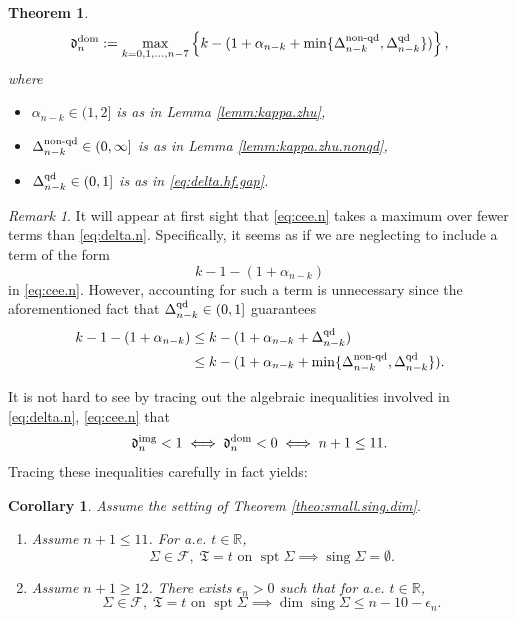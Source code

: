 \documentclass[11pt, letterpaper, reqno]{amsart}
\numberwithin{equation}{section}
\newtheorem{Thm}[Def]{Theorem}
\newtheorem{Cor}[Def]{Corollary}
\theoremstyle{remark}
\newtheorem{Rem}[Def]{Remark}
\newcommand{\RR}{\mathbb{R}}
\newcommand{\frT}{\mathfrak{T}}
\newcommand{\supp}{\operatorname{spt}}
\newcommand{\sing}{\operatorname{sing}}
\begin{document}
\begin{Thm}
\begin{equation}
	\end{equation}
	\begin{equation} \label{eq:cee.n}
		\mathfrak{d}_{n}^{\textnormal{dom}} := \max_{k = 0, 1, \ldots, n-7} \left\{ k - (1 + \alpha_{n-k} + \min \{ \Delta^{\textnormal{non-qd}}_{n-k},  \Delta^{\textnormal{qd}}_{n-k} \} ) \right \},
	\end{equation}
	where
	\begin{itemize}
		\item $\alpha_{n-k} \in (1, 2]$ is as in Lemma \ref{lemm:kappa.zhu},
		\item $\Delta^{\textnormal{non-qd}}_{n-k} \in (0, \infty]$ is as in Lemma \ref{lemm:kappa.zhu.nonqd},
		\item $\Delta^{\textnormal{qd}}_{n-k} \in (0, 1]$ is as in \eqref{eq:delta.hf.gap}.
	\end{itemize}
\end{Thm}

\begin{Rem}
    It will appear at first sight that \eqref{eq:cee.n} takes a maximum over fewer terms than \eqref{eq:delta.n}. Specifically, it seems as if we are neglecting to include a term of the form
    \[ k-1-(1+\alpha_{n-k}) \]
    in \eqref{eq:cee.n}. However, accounting for such a term is unnecessary since the aforementioned fact that $\Delta^{\textnormal{qd}}_{n-k} \in (0, 1]$ guarantees
    \begin{align*}
        k-1-(1+\alpha_{n-k}) 
            & \leq k-(1 + \alpha_{n-k} + \Delta^{\textnormal{qd}}_{n-k}) \\
            & \leq k-(1 + \alpha_{n-k} + \min \{ \Delta^{\textnormal{non-qd}}_{n-k}, \Delta^{\textnormal{qd}}_{n-k} \}).
    \end{align*} 
\end{Rem}

It is not hard to see by tracing out the algebraic inequalities involved in \eqref{eq:delta.n}, \eqref{eq:cee.n} that 
\[ \mathfrak{d}_{n}^{\textnormal{img}} < 1 \iff \mathfrak{d}_{n}^{\textnormal{dom}} < 0 \iff n+1 \leq 11. \]
Tracing these inequalities carefully in fact yields:

\begin{Cor} \label{coro:small.sing.dim}
	Assume the setting of Theorem \ref{theo:small.sing.dim}. 
	\begin{enumerate}
		\item[(i)] Assume $n+1 \leq 11$. For a.e. $t \in \RR$,
			\[ \Sigma \in \mathscr{F}, \; \frT = t \text{ on } \supp \Sigma \implies \sing \Sigma = \emptyset. \]
		\item[(ii)] Assume $n+1 \geq 12$. There exists $\epsilon_n > 0$ such that for a.e. $t \in \RR$, 
			\[ \Sigma \in \mathscr{F}, \; \frT = t \text{ on } \supp \Sigma \implies \dim \sing \Sigma \leq n-10-\epsilon_n. \]
	\end{enumerate}
\end{Cor}
\end{document}

